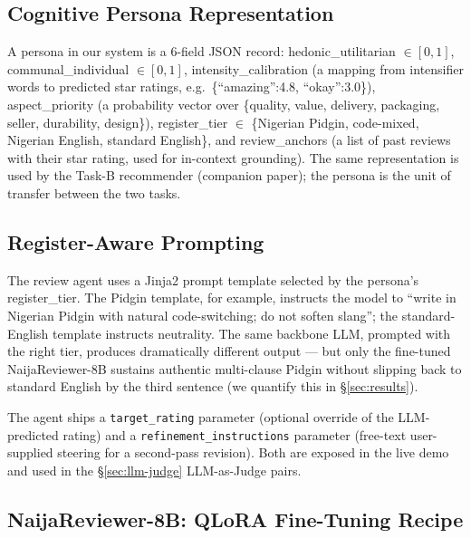 \documentclass[sigconf,nonacm,balance]{acmart}
\begin{document}
\subsection{Cognitive Persona Representation}

A persona in our system is a 6-field JSON record:
\textsf{hedonic\_utilitarian} $\in [0,1]$,
\textsf{communal\_individual} $\in [0,1]$,
\textsf{intensity\_calibration} (a mapping from intensifier words to predicted
star ratings, e.g.\ \textsf{\{``amazing'':4.8, ``okay'':3.0\}}),
\textsf{aspect\_priority} (a probability vector over
\{quality, value, delivery, packaging, seller, durability, design\}),
\textsf{register\_tier} $\in$ \{Nigerian Pidgin, code-mixed,
Nigerian English, standard English\}, and
\textsf{review\_anchors} (a list of past reviews with their star rating,
used for in-context grounding). The same representation is used by the
Task-B recommender (companion paper); the persona is the unit of transfer
between the two tasks.

\subsection{Register-Aware Prompting}

The review agent uses a Jinja2 prompt template selected by the persona's
\textsf{register\_tier}. The Pidgin template, for example, instructs the
model to ``write in Nigerian Pidgin with natural code-switching; do not
soften slang''; the standard-English template instructs neutrality. The
same backbone LLM, prompted with the right tier, produces dramatically
different output --- but only the fine-tuned NaijaReviewer-8B sustains
authentic multi-clause Pidgin without slipping back to standard English
by the third sentence (we quantify this in §\ref{sec:results}).

The agent ships a \texttt{target\_rating} parameter (optional override
of the LLM-predicted rating) and a \texttt{refinement\_instructions}
parameter (free-text user-supplied steering for a second-pass revision).
Both are exposed in the live demo and used in the §\ref{sec:llm-judge}
LLM-as-Judge pairs.

\subsection{NaijaReviewer-8B: QLoRA Fine-Tuning Recipe}
\end{document}
